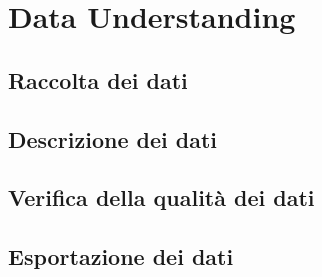 \chapter{Data Understanding}

\section{Raccolta dei dati}

\section{Descrizione dei dati}

\section{Verifica della qualità dei dati}

\section{Esportazione dei dati}

